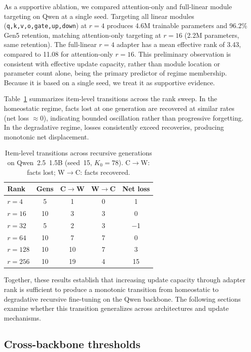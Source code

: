 \documentclass[a4paper,fleqn]{cas-dc}
\renewcommand{\arraystretch}{1.8}
\begin{document}
As a supportive ablation, we compared attention-only and full-linear module
targeting on Qwen at a single seed. Targeting all linear modules
(\texttt{q,k,v,o,gate,up,down}) at $r=4$ produces 4.6M trainable parameters and
96.2\% Gen5 retention, matching attention-only targeting at $r=16$ (2.2M
parameters, same retention). The full-linear $r=4$ adapter has a mean effective
rank of 3.43, compared to 11.08 for attention-only $r=16$. This preliminary
observation is consistent with effective update capacity, rather than module
location or parameter count alone, being the primary predictor of regime
membership. Because it is based on a single seed, we treat it as supportive
evidence.

Table~\ref{tab:transitions} summarizes item-level transitions across the rank
sweep. In the homeostatic regime, facts lost at one generation are recovered at
similar rates (net loss $\approx 0$), indicating bounded oscillation rather than
progressive forgetting. In the degradative regime, losses consistently exceed
recoveries, producing monotonic net displacement.

\begin{table}[htbp]
\caption{Item-level transitions across recursive generations on
Qwen~2.5~1.5B (seed~15, $K_0 = 78$). C$\to$W: facts lost; W$\to$C: facts
recovered.}\label{tab:transitions}
\footnotesize
\renewcommand{\arraystretch}{1.4}
\begin{tabular}{@{}lcccc@{}}
\toprule
Rank & Gens & C$\to$W & W$\to$C & Net loss \\
\midrule
$r=4$   & 5  & 1  & 0 & 1 \\
$r=16$  & 10 & 3  & 3 & 0 \\
$r=32$  & 5  & 2  & 3 & $-$1 \\
$r=64$  & 10 & 7  & 7 & 0 \\
$r=128$ & 10 & 10 & 7 & 3 \\
$r=256$ & 10 & 19 & 4 & 15 \\
\bottomrule
\end{tabular}
\end{table}

Together, these results establish that increasing update capacity through adapter
rank is sufficient to produce a monotonic transition from homeostatic to
degradative recursive fine-tuning on the Qwen backbone. The following sections
examine whether this transition generalizes across architectures and update
mechanisms.

\subsection{Cross-backbone thresholds}\label{sec:res_backbone}
\end{document}
